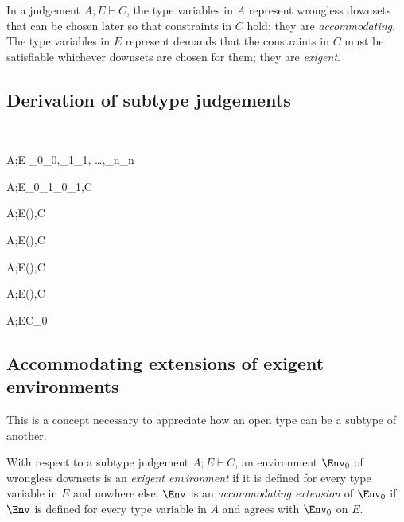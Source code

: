 \documentclass{amsart}
\theoremstyle{definition}
\begin{document}
In a judgement $A;E\vdash C$, the type variables in $A$ represent
wrongless downsets that can be chosen later so that constraints
in $C$ hold; they are \emph{accommodating}. The type variables in
$E$ represent demands that the constraints in $C$ must be
satisfiable whichever downsets are chosen for them; they are
\emph{exigent}.

\subsection{Derivation of subtype judgements}~

\infrule[S-Refl]
{}
{A;E \vdash \tau_0\Sub\tau_0,\tau_1\Sub\tau_1,
\ldots,\tau_n\Sub\tau_n}

{A;E\vdash\sigma_0\R\sigma_1\Sub\tau_0\R\tau_1,C}


{A;E\vdash(\All\alpha\sigma)\Sub\tau,C}

{A;E\vdash\sigma\Sub(\Ex\alpha\tau),C}

{A;E\vdash(\Ex\alpha\sigma)\Sub\tau,C}

{A;E\vdash\sigma\Sub(\All\alpha\tau),C}

{A;E\vdash C_0}

\subsection{Accommodating extensions of exigent environments}
This is a concept necessary to appreciate how an open type can be
a subtype of another.

With respect to a subtype judgement $A;E\vdash C$, an environment
$\Env_0$ of wrongless downsets is an \emph{exigent environment}
if it is defined for every type variable in $E$ and nowhere else.
$\Env$ is an \emph{accommodating extension} of $\Env_0$ if $\Env$
is defined for every type variable in $A$ and agrees with
$\Env_0$ on $E$.
\end{document}
